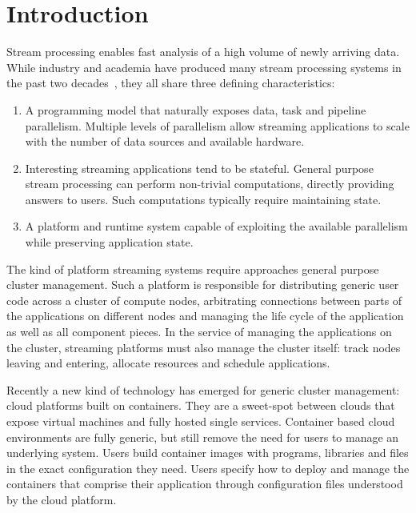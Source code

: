 \section{Introduction}

Stream processing enables fast analysis of a high volume of newly arriving data.
While industry and academia have produced many stream processing systems in 
the past two decades~\cite{stream-2003, borealis-2005, spade-2008,
                           millwheel-2013, naiad-2013, storm-2014,
                           heron-2015, flink-2015, dataflow-2015, 
                           flink-2017},
they all share three defining characteristics:

\begin{enumerate}
    \item A programming model that naturally exposes data, task and pipeline
    parallelism. Multiple levels of parallelism allow streaming applications to
    scale with the number of data sources and available hardware.

    \item Interesting streaming applications tend to be stateful. General 
    purpose stream processing can perform non-trivial computations, directly 
    providing answers to users. Such computations typically require
    maintaining state.

    \item A platform and runtime system capable of exploiting the available 
    parallelism while preserving application state.
\end{enumerate}

The kind of platform streaming systems require approaches general purpose
cluster management. Such a platform is responsible for distributing generic user
code across a cluster of compute nodes, arbitrating connections between parts of
the applications on different nodes and managing the life cycle of the
application as well as all component pieces. In the service of managing the
applications on the cluster, streaming platforms must also manage the cluster
itself: track nodes leaving and entering, allocate resources and schedule
applications.

Recently a new kind of technology has emerged for generic cluster management:
cloud platforms built on containers. They are a sweet-spot between clouds that
expose virtual machines and fully hosted single services. Container based cloud
environments are fully generic, but still remove the need for users to manage
an underlying system. Users build container images with programs, libraries and
files in the exact configuration they need.  Users specify how to deploy and
manage the containers that comprise their application through configuration
files understood by the cloud platform.


